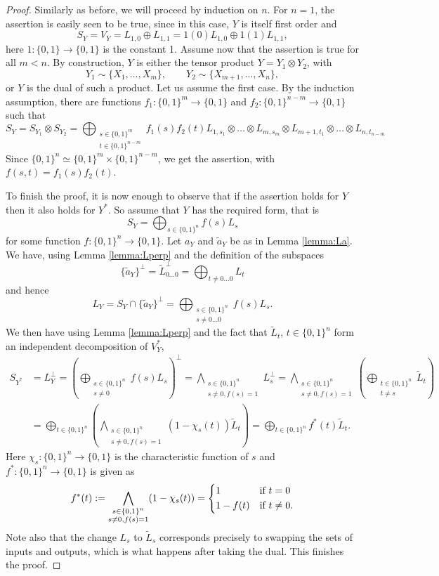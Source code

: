 \documentclass[12pt]{article}
\theoremstyle{definition}
\theoremstyle{remark}
\begin{document}
\begin{proof} Similarly as before, we will proceed by induction on $n$. For $n=1$, the assertion is easily seen
to be true, since in this case, $Y$ is itself first order and
\[
S_Y=V_Y=L_{1,0}\oplus L_{1,1}=1(0)L_{1,0}\oplus 1(1)L_{1,1},
\]
here $1:\{0,1\}\to \{0,1\}$ is the constant 1. Assume now that the assertion is true for
all $m<n$. By construction, $Y$ is either the tensor product $Y=Y_1\otimes Y_2$, with
\[
Y_1\sim \{X_{1},\dots, X_{m}\},\qquad Y_2\sim\{X_{m+1},\dots, X_{n}\},
\]
 or $Y$ is the dual of such a product. Let us assume the first case.  By the induction 
assumption, there are functions $f_1:\{0,1\}^{m}\to \{0,1\}$ and $f_2:\{0,1\}^{n-m}\to
\{0,1\}$ such that
\[
S_Y=S_{Y_1}\otimes S_{Y_2}=\bigoplus_{\substack{s\in\{0,1\}^{m}\\ t\in
\{0,1\}^{n-m}}}
f_1(s)f_2(t)L_{1,s_{1}}\otimes\dots \otimes L_{m,s_{m}}\otimes
L_{m+1,t_{1}}\otimes\dots\otimes L_{n,t_{n-m}}
\]
Since $\{0,1\}^n\simeq \{0,1\}^m\times \{0,1\}^{n-m}$, we get the assertion, with
$f(s,t)=f_1(s)f_2(t)$.

To finish the proof, it is now enough to observe that if the assertion holds for $Y$ then
it also  holds for $Y^*$. So assume that $Y$ has the required form, that is
\[
S_Y=\bigoplus_{s\in\{0,1\}^n}f(s)L_s
\]
for some function $f:\{0,1\}^n\to \{0,1\}$. 
Let $a_Y$ and $\tilde a_Y$ be as in  Lemma \ref{lemma:La}. 
We have, using Lemma \ref{lemma:Lperp} and the definition of the subspaces
\[
\{\tilde a_Y\}^\perp=\tilde L_{0\dots 0}^\perp=\bigoplus_{t\ne 0\dots 0} L_t
\]
and hence
\[
L_Y=S_Y\cap\{\tilde a_Y\}^\perp=\bigoplus_{\substack{s\in \{0,1\}^n\\ s\ne 0\dots 0}} f(s) L_s.
\]
We then have using Lemma \ref{lemma:Lperp} and the fact that $\tilde L_t$, $t\in
\{0,1\}^n$ form an independent decomposition of $V_Y^*$,
\begin{align*}
S_{Y^*}&=L_Y^\perp=\left(\bigoplus_{\substack{s\in \{0,1\}^n\\ s\ne 0}}
f(s)L_s\right)^\perp=\bigwedge_{\substack{s\in\{0,1\}^n\\ s\ne 0, f(s)=1}}L_s^\perp=
\bigwedge_{\substack{s\in\{0,1\}^n\\ s\ne 0,
f(s)=1}}\left(\bigoplus_{\substack{t\in\{0,1\}^n\\t\ne s}} \tilde L_t\right)\\
&=\bigoplus_{t\in\{0,1\}^n} \left(\bigwedge_{\substack{s\in \{0,1\}^n\\ s\ne 0, f(s)=1}}
(1-\chi_s(t))\tilde L_t\right)=\bigoplus_{t\in \{0,1\}^n} f^*(t) \tilde L_t.
\end{align*}
Here $\chi_s:\{0,1\}^n\to \{0,1\}$ is the characteristic function of $s$ and
$f^*:\{0,1\}^n\to \{0,1\}$ is given as
\[
f^*(t):=\bigwedge_{\substack{s\in \{0,1\}^n\\ s\ne 0, f(s)=1}}
(1-\chi_s(t))=\begin{dcases} 1 & \text{if } t=0\\ 1-f(t) & \text{if } t\ne 0.
\end{dcases}
\]
Note also that the change $L_s$ to $\tilde L_s$ corresponds precisely to swapping the sets
of inputs and outputs, which is what happens after taking the dual. This finishes the
proof.


\end{proof}
\end{document}
